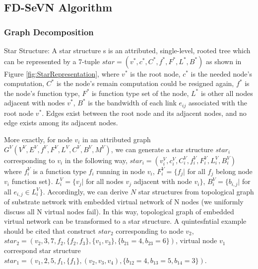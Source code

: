\subsection{FD-SeVN Algorithm}
\subsubsection{Graph Decomposition}
Star Structure: A star structure s is an attributed, single-level, rooted tree which can be represented by a 7-tuple $star=(v^*,c^*,C^*,f^*,F^*,L^*,B^*)$ as shown in Figure \ref{fig:StarRepresentation}, where $v^*$ is the root node, $c^*$ is the needed node's computation, $C^*$ is the node's remain computation could be resigned again, $f^*$ is the node's function type, $F^*$ is function type set of the node, $L^*$ is other all nodes  adjacent with nodes $v^*$, $B^*$ is the bandwidth of each link $e_{ij}$ associated with the root node $v^*$. Edges exist between the root node and its adjacent nodes, and no edge exists among its adjacent nodes.

More exactly, for node $v_i$ in an attributed graph  $G^V (V^V,E^V,f^V,F^V,L^V,C^V,B^V,M^V)$, we can generate a star structure $star_i$ corresponding to $v_i$ in the following way, $star_i=(v^V_i,c^V_i,C^V_i,f^V_i,F^V_i,L^V_i,B^V_i)$ where $f^V_i$ is a function type $f_i$ running in node $v_i$, $F^V_i=\{f_{j}|$ for all $f_j$ belong node $v_i$ function set$\}$.  $L^V_i=\{v_j|$ for all nodes $v_j$  adjacent with node $v_i\}$, $B^V_i=\{b_{i,j}| $ for all $e_{i,j}\in L^V_i\}$. Accordingly, we can derive $N$ star structures from topological graph of substrate network with embedded virtual network of N nodes (we uniformly discuss all N virtual nodes fail). In this way, topological graph of embedded virtual network can be transformed to a  star structure. A quintesfntial example should be cited that construct $star_2$ corresponding to node $v_2$, $star_2=(v_2,3,7,f_2,\{f_2,f_3\},\{v_1,v_3\},\{b_{21}=4,b_{23}=6\})$, virtual node $v_1$ correspond star structure $star_1=(v_1,2,5,f_1,\{f_1\},(v_2,v_3,v_4),\{b_{12}=4,b_{13}=5,b_{14}=3\})$.


